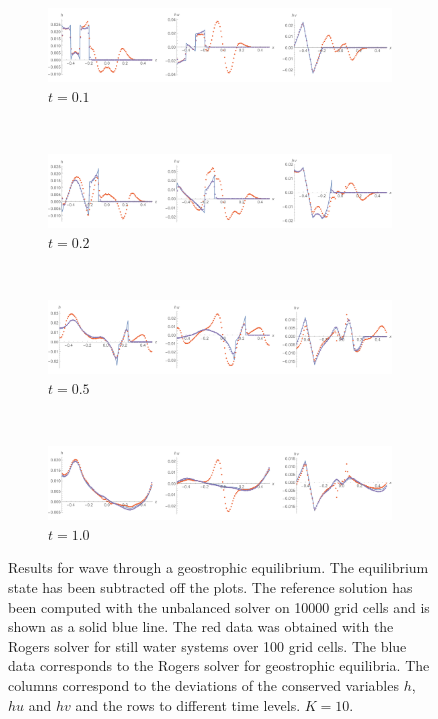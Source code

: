 \begin{figure}
  \centering
  \begin{subfigure}{\textwidth}
    \includegraphics[width=\textwidth]{diagrams/results-geo-wave-rog-1}
    \caption{$t = 0.1$}
    \label{fig:results-geo-wave-rog-1}
  \end{subfigure} \\
  \begin{subfigure}{\textwidth}
    \includegraphics[width=\textwidth]{diagrams/results-geo-wave-rog-2}
    \caption{$t = 0.2$}
    \label{fig:results-geo-wave-rog-2}
  \end{subfigure} \\
  \begin{subfigure}{\textwidth}
    \includegraphics[width=\textwidth]{diagrams/results-geo-wave-rog-5}
    \caption{$t = 0.5$}
    \label{fig:results-geo-wave-rog-5}
  \end{subfigure} \\
  \begin{subfigure}{\textwidth}
    \includegraphics[width=\textwidth]{diagrams/results-geo-wave-rog-10}
    \caption{$t = 1.0$}
    \label{fig:results-geo-wave-rog-10}
  \end{subfigure}
  \caption{Results for wave through a geostrophic equilibrium. The equilibrium state has been subtracted off the plots. The reference solution has been computed with the unbalanced solver on 10000 grid cells and is shown as a solid blue line. The red data was obtained with the Rogers solver for still water systems over 100 grid cells. The blue data corresponds to the Rogers solver for geostrophic equilibria. The columns correspond to the deviations of the conserved variables $h$, $hu$ and $hv$ and the rows to different time levels. $K = 10$.}
  \label{fig:results-geo-wave-rog}
\end{figure}

